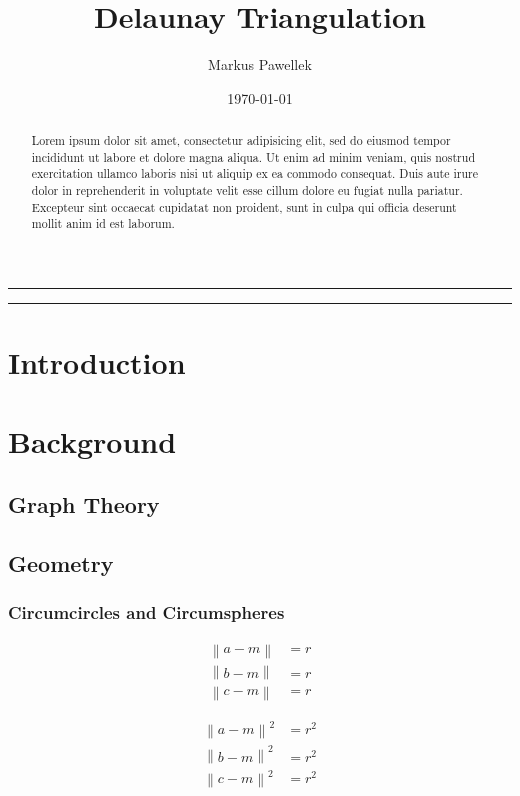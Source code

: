 \documentclass[10pt, twoside, fleqn]{article}
\title{Delaunay Triangulation}
\author{Markus Pawellek}
\date{\today}
\let\oldsection\section
\renewcommand*\section{%
  \cleardoublepage
  \thispagestyle{sectionstyle}\oldsection}
\let\oldpagenumbering\pagenumbering
\renewcommand*\pagenumbering[1]{%
  \cleardoublepage
  \oldpagenumbering{#1}}
\newcommand{\norm}[1]{\left\| #1 \right\|}
\begin{document}
  \maketitle
  \thispagestyle{empty}

  \bigskip
  \hrule
  \medskip
  \begin{abstract}
    Lorem ipsum dolor sit amet, consectetur adipisicing elit, sed do eiusmod
    tempor incididunt ut labore et dolore magna aliqua. Ut enim ad minim veniam,
    quis nostrud exercitation ullamco laboris nisi ut aliquip ex ea commodo
    consequat. Duis aute irure dolor in reprehenderit in voluptate velit esse
    cillum dolore eu fugiat nulla pariatur. Excepteur sint occaecat cupidatat non
    proident, sunt in culpa qui officia deserunt mollit anim id est laborum.
  \end{abstract}
  \medskip
  \hrule
  \bigskip

  \tableofcontents

  \section{Introduction}
  \section{Background}
    \subsection{Graph Theory}
    \subsection{Geometry}
      \subsubsection{Circumcircles and Circumspheres}

        \begin{align*}
          \norm{a - m} &= r \\
          \norm{b - m} &= r \\
          \norm{c - m} &= r
        \end{align*}

        \begin{align*}
          \norm{a - m}^2 &= r^2 \\
          \norm{b - m}^2 &= r^2 \\
          \norm{c - m}^2 &= r^2
        \end{align*}
\end{document}
